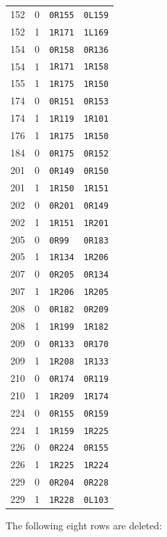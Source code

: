 \begin{longtable}{@{}rrll@{}}
152 & 0 & \texttt{0R155} & \texttt{0L159}\\
152 & 1 & \texttt{1R171} & \texttt{1L169}\\
154 & 0 & \texttt{0R158} & \texttt{0R136}\\
154 & 1 & \texttt{1R171} & \texttt{1R158}\\
155 & 1 & \texttt{1R175} & \texttt{1R150}\\
174 & 0 & \texttt{0R151} & \texttt{0R153}\\
174 & 1 & \texttt{1R119} & \texttt{1R101}\\
176 & 1 & \texttt{1R175} & \texttt{1R150}\\
184 & 0 & \texttt{0R175} & \texttt{0R152}\\
201 & 0 & \texttt{0R149} & \texttt{0R150}\\
201 & 1 & \texttt{1R150} & \texttt{1R151}\\
202 & 0 & \texttt{0R201} & \texttt{0R149}\\
202 & 1 & \texttt{1R151} & \texttt{1R201}\\
205 & 0 & \texttt{0R99} & \texttt{0R183}\\
205 & 1 & \texttt{1R134} & \texttt{1R206}\\
207 & 0 & \texttt{0R205} & \texttt{0R134}\\
207 & 1 & \texttt{1R206} & \texttt{1R205}\\
208 & 0 & \texttt{0R182} & \texttt{0R209}\\
208 & 1 & \texttt{1R199} & \texttt{1R182}\\
209 & 0 & \texttt{0R133} & \texttt{0R170}\\
209 & 1 & \texttt{1R208} & \texttt{1R133}\\
210 & 0 & \texttt{0R174} & \texttt{0R119}\\
210 & 1 & \texttt{1R209} & \texttt{1R174}\\
224 & 0 & \texttt{0R155} & \texttt{0R159}\\
224 & 1 & \texttt{1R159} & \texttt{1R225}\\
226 & 0 & \texttt{0R224} & \texttt{0R155}\\
226 & 1 & \texttt{1R225} & \texttt{1R224}\\
229 & 0 & \texttt{0R204} & \texttt{0R228}\\
229 & 1 & \texttt{1R228} & \texttt{0L103}\\
\end{longtable}
The following eight rows are deleted:
